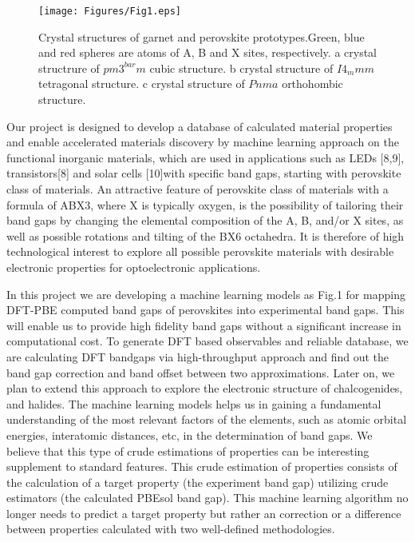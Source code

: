 \documentclass[%
twocolumn,
 amsmath,amssymb,
 aps, citeautoscript,
prb,
]{revtex4-1}
\begin{document}
\begin{figure}[ht!]
\begin{center}
\texttt{[image: Figures/Fig1.eps]}
\end{center}
\caption{ Crystal structures of garnet and perovskite prototypes.Green, blue and red spheres are atoms of A, B and X sites, respectively. a crystal structrure of $pm3^{bar}m$ cubic structure. b crystal structure of $I4_mmm$ tetragonal structure. c crystal structure of $Pnma$ orthohombic structure.}
\label{fig1}
\end{figure}

Our project is designed to develop a database of calculated material properties and enable accelerated materials discovery by machine learning approach on the functional inorganic materials, which are used in applications such as LEDs  [8,9], transistors[8]  and solar cells  [10]with specific band gaps, starting with perovskite class of materials. An attractive feature of perovskite class of materials with a formula of ABX3, where X is  typically  oxygen,  is  the  possibility  of  tailoring  their  band  gaps  by changing the elemental composition of the A, B, and/or X sites, as well as possible rotations and tilting of the BX6 octahedra.  It is therefore of high technological interest to explore all possible perovskite materials with desirable electronic properties for optoelectronic applications.   

In this project we are developing a machine learning models as Fig.1 for mapping DFT-PBE computed band gaps of perovskites into experimental band gaps.  This will enable us to provide high fidelity band gaps without a significant increase in computational cost.  To generate DFT based observables and reliable database, we are calculating DFT bandgaps via high-throughput approach and find out the band gap correction and band offset between two approximations. Later on, we plan to extend this approach to explore the electronic structure of chalcogenides, and halides.  The machine learning models helps us in gaining a fundamental understanding of the most relevant factors of the elements, such as atomic orbital energies, interatomic distances, etc, in the determination of band gaps. We believe that this type of crude estimations of properties can be interesting supplement to standard features.  This crude estimation of properties consists of the calculation of a target property (the experiment band gap) utilizing crude estimators (the calculated PBEsol band gap). This machine learning algorithm no longer needs to predict a target property but rather an correction or a difference between properties calculated with two well-defined methodologies. 
\end{document}
